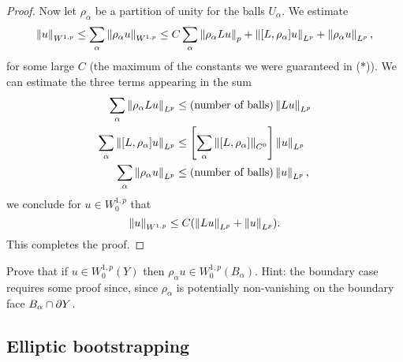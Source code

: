 \documentclass{amsart}
\begin{document}
\begin{proof}
  Now let $\rho_{\alpha}$ be a partition of unity for the balls
  $U_{\alpha}$. We estimate
  \begin{equation*}
    \left\lVert u\right\rVert_{W^{1,p}}\le
    \sum_{\alpha}\left\lVert\rho_{\alpha}u\right\rVert_{W^{1,p}}\le C\sum_{\alpha} \left\lVert\rho_{\alpha}Lu\right\rVert_{p}+\left\lVert[L,\rho_{\alpha}]u\right\rVert_{L^{p}}+\left\lVert\rho_{\alpha}u\right\rVert_{L^{p}},
  \end{equation*}
  for some large $C$ (the maximum of the constants we were
  guaranteed in ($\ast$)). We can estimate the three terms appearing
  in the sum
  \begin{equation*}
    \begin{aligned}
      \sum_{\alpha}\left\lVert\rho_{\alpha}Lu\right\rVert_{L^{p}}&\le (\text{number of
        balls})\left\lVert Lu\right\rVert_{L^{p}}\\
      \sum_{\alpha}\left\lVert[L,\rho_{\alpha}]u\right\rVert_{L^{p}}&\le
      \left[\sum_{\alpha}\left\lVert[L,\rho_{\alpha}]\right\rVert_{C^{0}}\right]\left\lVert u\right\rVert_{L^{p}}\\
      \sum_{\alpha}\left\lVert\rho_{\alpha}u\right\rVert_{L^{p}}&\le (\text{number of
        balls})\left\lVert u\right\rVert_{L^{p}},
    \end{aligned}    
  \end{equation*}
  we conclude for $u\in W^{1,p}_{0}$ that
  \begin{equation*}
    \left\lVert u\right\rVert_{W^{1,p}}\le C(\left\lVert Lu\right\rVert_{L^{p}}+\left\lVert u\right\rVert_{L^{p}}).
  \end{equation*}
  This completes the proof.    
\end{proof}
\begin{xca}
  Prove that if $u\in W^{1,p}_{0}(Y)$ then
  $\rho_{\alpha}u\in W^{1,p}_{0}(B_{\alpha})$. Hint: the boundary case
  requires some proof since, since $\rho_{\alpha}$ is potentially
  non-vanishing on the boundary face $B_{\alpha}\cap \partial Y$.
\end{xca}

\subsection*{Elliptic bootstrapping}
\end{document}
